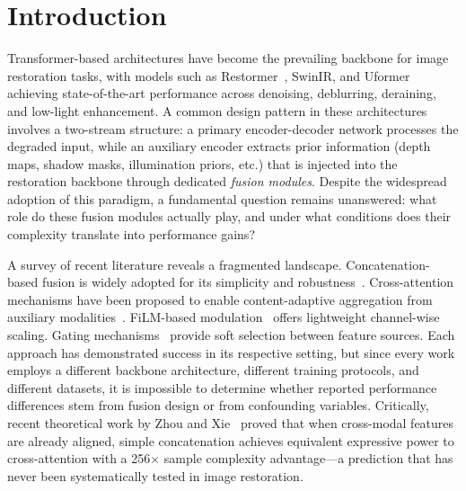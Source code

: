 \documentclass[pdflatex,sn-basic,Numbered]{sn-jnl}
\theoremstyle{thmstyleone}
\theoremstyle{thmstyletwo}
\theoremstyle{thmstylethree}
\begin{document}

\maketitle

\section{Introduction}\label{sec:intro}

Transformer-based architectures have become the prevailing backbone for image restoration tasks, with models such as Restormer~\cite{zamir2022restormer}, SwinIR, and Uformer achieving state-of-the-art performance across denoising, deblurring, deraining, and low-light enhancement.
A common design pattern in these architectures involves a two-stream structure: a primary encoder-decoder network processes the degraded input, while an auxiliary encoder extracts prior information (depth maps, shadow masks, illumination priors, etc.) that is injected into the restoration backbone through dedicated \textit{fusion modules}.
Despite the widespread adoption of this paradigm, a fundamental question remains unanswered: what role do these fusion modules actually play, and under what conditions does their complexity translate into performance gains?

A survey of recent literature reveals a fragmented landscape.
Concatenation-based fusion is widely adopted for its simplicity and robustness~\cite{wang2019edvr}.
Cross-attention mechanisms have been proposed to enable content-adaptive aggregation from auxiliary modalities~\cite{mdformer2025}.
FiLM-based modulation~\cite{perez2018film} offers lightweight channel-wise scaling.
Gating mechanisms~\cite{radfuse2025,scafnet2025} provide soft selection between feature sources.
Each approach has demonstrated success in its respective setting, but since every work employs a different backbone architecture, different training protocols, and different datasets, it is impossible to determine whether reported performance differences stem from fusion design or from confounding variables.
Critically, recent theoretical work by Zhou and Xie~\cite{zhou2026feature} proved that when cross-modal features are already aligned, simple concatenation achieves equivalent expressive power to cross-attention with a 256$\times$ sample complexity advantage---a prediction that has never been systematically tested in image restoration.
\end{document}
